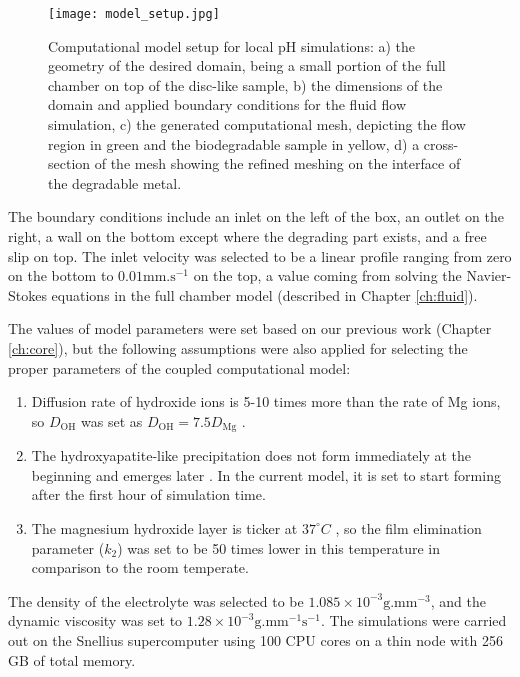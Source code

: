 \begin{figure}[h]
\centering
\medskip
\texttt{[image: model\_setup.jpg]}
\caption[Computational model setup for local pH simulations]{Computational model setup for local pH simulations: a) the geometry of the desired domain, being a small portion of the full chamber on top of the disc-like sample, b) the dimensions of the domain and applied boundary conditions for the fluid flow simulation, c) the generated computational mesh, depicting the flow region in green and the biodegradable sample in yellow, d) a cross-section of the mesh showing the refined meshing on the interface of the degradable metal.} \label{fig:kinetics_model_setup}
\end{figure}

The boundary conditions include an inlet on the left of the box, an outlet on the right, a wall on the bottom except where the degrading part exists, and a free slip on top. The inlet velocity was selected to be a linear profile ranging from zero on the bottom to $0.01 \text{mm.s}^{-1}$ on the top, a value coming from solving the Navier-Stokes equations in the full chamber model (described in Chapter \ref{ch:fluid}).

The values of model parameters were set based on our previous work \cite{Barzegari2021} (Chapter \ref{ch:core}), but the following assumptions were also applied for selecting the proper parameters of the coupled computational model:
\begin{enumerate}
\item
Diffusion rate of hydroxide ions is 5-10 times more than the rate of Mg ions, so $D_{\mathrm{OH}}$ was set as $D_{\mathrm{OH}} = 7.5 D_{\mathrm{Mg}}$ \cite{Gonzalez2021}.
\item
The hydroxyapatite-like precipitation does not form immediately at the beginning and emerges later \cite{Gonzalez2021,Wang2022}. In the current model, it is set to start forming after the first hour of simulation time.
\item
The magnesium hydroxide layer is ticker at $37^{\circ}C$ \cite{Wang2022}, so the film elimination parameter ($k_2$) was set to be 50 times lower in this temperature in comparison to the room temperate.
\end{enumerate}

The density of the electrolyte was selected to be $1.085\times10^{-3} \text{g.mm}^{-3}$, and the dynamic viscosity was set to $1.28\times10^{-3} \text{g.mm}^{-1}\text{s}^{-1}$. The simulations were carried out on the Snellius supercomputer using 100 \gls{CPU} cores on a thin node with 256 GB of total memory.



